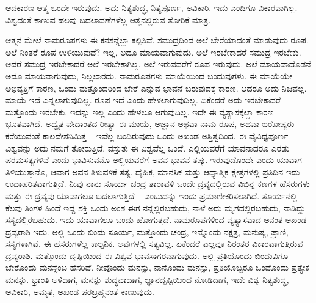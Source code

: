 \vskip 0.2cm

ಆದಕಾರಣ ಆತ್ಮ ಒಂದೇ ಇರುವುದು. ಅದು ನಿತ್ಯಶುದ್ಧ, ನಿತ್ಯಪೂರ್ಣ, ಅವಿಕಾರಿ. ಇದು ಎಂದಿಗೂ ವಿಕಾರವಾಗಿಲ್ಲ. ವಿಶ್ವದಂತೆ ಕಾಣುವ ಹಲವು ಬದಲಾವಣೆಗಳೆಲ್ಲ ಆತ್ಮನಲ್ಲಿರುವ ತೋರಿಕೆ ಮಾತ್ರ.

\vskip 0.2cm

ಆತ್ಮನ ಮೇಲೆ ನಾಮರೂಪಗಳು ಈ ಕನಸನ್ನೆಲ್ಲಾ ಕಲ್ಪಿಸಿವೆ. ಸಮುದ್ರದಿಂದ ಅಲೆ ಬೇರೆಯಾದಂತೆ ಮಾಡುವುದು ರೂಪ. ಅಲೆ ನಿಂತರೆ ರೂಪ ಉಳಿಯುವುದೆ? ಇಲ್ಲ, ಅದೂ ಮಾಯವಾಗುವುದು. ಅಲೆ ಇರಬೇಕಾದರೆ ಸಮುದ್ರ ಇರಬೇಕು. ಆದರೆ ಸಮುದ್ರ ಇರಬೇಕಾದರೆ ಅಲೆ ಇರಬೇಕಾಗಿಲ್ಲ. ಅಲೆ ಇರುವವರೆಗೆ ರೂಪ ಇರುವುದು. ಅಲೆ ಮಾಯವಾದೊಡನೆ ಅದೂ ಮಾಯವಾಗುವುದು, ನಿಲ್ಲಲಾರದು. ನಾಮರೂಪಗಳು ಮಾಯೆಯಿಂದ ಬಂದುವುಗಳು. ಈ ಮಾಯೆಯೇ ಅಭಿವ್ಯಕ್ತಿಗೆ ಕಾರಣ, ಒಂದು ಮತ್ತೊಂದರಿಂದ ಬೇರೆ ಎನ್ನುವ ಭಾವನೆ ಬರುವುದಕ್ಕೆ ಕಾರಣ. ಆದರೂ ಅದು ನಿಜವಲ್ಲ. ಮಾಯೆ ಇದೆ ಎನ್ನಲಾಗುವುದಿಲ್ಲ. ರೂಪ ಇದೆ ಎಂದು ಹೇಳಲಾಗುವುದಿಲ್ಲ. ಏಕೆಂದರೆ ಅದು ಇರಬೇಕಾದರೆ ಮತ್ತೊಂದು ಇರಬೇಕು. ಇದನ್ನು ಇಲ್ಲ ಎಂದು ಹೇಳಲೂ ಆಗುವುದಿಲ್ಲ. ಇದೇ ಈ ವ್ಯತ್ಯಾಸಕ್ಕೆಲ್ಲಾ ಕಾರಣ ಭೂತವಾಗಿದೆ. ಅದ್ವೈತ ವೇದಾಂತದ ರೀತ್ಯಾ ಈ ಮಾಯೆ, ಅಜ್ಞಾನ ಅಥವಾ ನಾಮ ರೂಪ, ಅಥವಾ ಐರೋಪ್ಯರು ಕರೆಯುವಂತೆ ಕಾಲದೇಶನಿಮಿತ್ತ – ಇವೆಲ್ಲ ಬಂದಿರುವುದು ಒಂದು ಅಖಂಡ ಅಸ್ತಿತ್ವದಿಂದ. ಈ ವೈವಿಧ್ಯಪೂರ್ಣ ವಿಶ್ವವನ್ನು ಅದು ನಮಗೆ ತೋರುತ್ತಿದೆ. ವಸ್ತುತಃ ಈ ವಿಶ್ವವೆಲ್ಲ ಒಂದೆ. ಎಲ್ಲಿಯವರೆಗೆ ಯಾವನಾದರೂ ಎರಡು ಪರಮಸತ್ಯಗಳಿವೆ ಎಂದು ಭಾವಿಸುವನೊ ಅಲ್ಲಿಯವರೆಗೆ ಅವನ ಭಾವನೆ ತಪ್ಪು. ಇರುವುದೊಂದೇ ಎಂದು ಯಾವಾಗ ತಿಳಿಯುತ್ತಾನೊ, ಆವಾಗ ಅವನ ತಿಳುವಳಿಕೆ ಸತ್ಯ. ದೈಹಿಕ, ಮಾನಸಿಕ ಮತ್ತು ಆಧ್ಯಾತ್ಮಿಕ ಕ್ಷೇತ್ರಗಳಲ್ಲಿ ಪ್ರತಿದಿನ ಇದು ಉದಾಹರಿತವಾಗುತ್ತಿದೆ. ನೀವು ನಾನು ಸೂರ್ಯ ಚಂದ್ರ ತಾರಾವಳಿ ಒಂದೇ ದ್ರವ್ಯದಲ್ಲಿರುವ ವಿಭಿನ್ನ ಕಣಗಳ ಹೆಸರುಗಳು ಮತ್ತು ಈ ದ್ರವ್ಯವು ಯಾವಾಗಲೂ ಬದಲಾಗುತ್ತಿದೆ – ಎಂಬುದನ್ನು ಇಂದು ಪ್ರಮಾಣೀಕರಿಸಲಾಗಿದೆ. ಸೂರ್ಯನಲ್ಲಿ ಕೆಲವು ತಿಂಗಳ ಹಿಂದೆ ಇದ್ದ ಶಕ್ತಿ ಒಂದು ಅಂಶ ಈಗ ನನ್ನಲ್ಲಿರಬಹುದು, ನಾಳೆ ಅದು ಮೃಗದಲ್ಲಿರಬಹುದು, ನಾಡಿದ್ದು ಸಸ್ಯದಲ್ಲಿರಬಹುದು. ಇದು ಯಾವಾಗಲೂ ಬಂದು ಹೋಗುತ್ತದೆ. ನಾಮರೂಪಗಳಿಂದ ವ್ಯತ್ಯಾಸವಾದ ಅನಂತ ಅಖಂಡ ದ್ರವ್ಯರಾಶಿ ಇದು. ಅಲ್ಲಿ ಒಂದು ಬಿಂದು ಸೂರ್ಯ, ಮತ್ತೊಂದು ಚಂದ್ರ, ಇನ್ನೊಂದು ನಕ್ಷತ್ರ, ಮನುಷ್ಯ, ಪ್ರಾಣಿ, ಸಸ್ಯಗಳಾಗಿವೆ. ಈ ಹೆಸರುಗಳೆಲ್ಲ ಕಾಲ್ಪನಿಕ. ಅವುಗಳಲ್ಲಿ ಸತ್ಯವಿಲ್ಲ. ಏಕೆಂದರೆ ಎಲ್ಲವೂ ನಿರಂತರ ವಿಕಾರವಾಗುತ್ತಿರುವ ದ್ರವ್ಯರಾಶಿ. ಮತ್ತೊಂದು ದೃಷ್ಟಿಯಿಂದ ಈ ವಿಶ್ವವೆ ಭಾವಸಾಗರವಾಗುವುದು. ಅಲ್ಲಿ ಪ್ರತಿಯೊಂದು ಬಿಂದುವಿಗೂ ಬೇರೊಂದು ಮನಸ್ಸೆಂಬ ಹೆಸರಿದೆ. ನೀವೊಂದು ಮನಸ್ಸು, ನಾನೊಂದು ಮನಸ್ಸು, ಪ್ರತಿಯೊಬ್ಬರೂ ಒಂದೊಂದು ಪ್ರತ್ಯೇಕ ಮನಸ್ಸು. ಭ್ರಾಂತಿ ಅಳಿದಾಗ, ಮನಸ್ಸು ಶುದ್ಧವಾದಾಗ, ಜ್ಞಾನದೃಷ್ಟಿಯಿಂದ ನೋಡಿದಾಗ, ಇದೇ ವಿಶ್ವ ನಿತ್ಯಶುದ್ಧ, ಅವಿಕಾರಿ, ಅಮೃತ, ಅಖಂಡ ಪರಬ್ರಹ್ಮನಂತೆ ಕಾಣುವುದು.

\vskip 0.2cm

